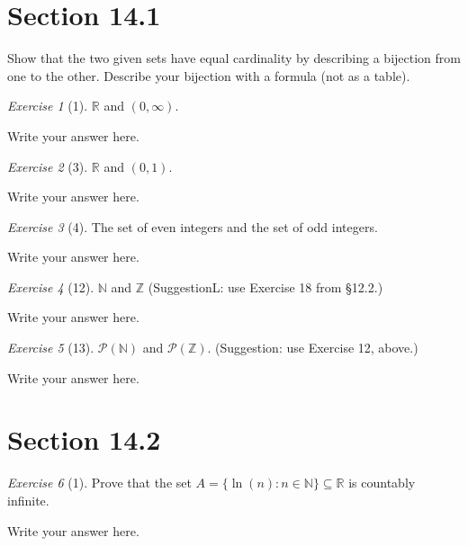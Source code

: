 \documentclass[12pt]{amsart}
\makeatletter
\theoremstyle{remark}
\newtheorem*{exercise}{Exercise}%
\def\RR{\ensuremath{\mathbb R}}
\def\NN{\ensuremath{\mathbb N}}
\def\ZZ{\ensuremath{\mathbb Z}}
\newcommand{\mc}[1]{\ensuremath{\mathcal{#1}}} %
\renewenvironment{proof}[1][\proofname]{\par\doublespacing
  \pushQED{\qed}%
  \normalfont \topsep6\p@\@plus6\p@\relax
  \list{}{%
    \settowidth{\leftmargin}{\itshape\proofname:\hskip\labelsep}%
    \setlength{\labelwidth}{0pt}%
    \setlength{\itemindent}{-\leftmargin}%
  }%
  \item[\hskip\labelsep\itshape#1\@addpunct{:}]\ignorespaces
}{%
  \popQED\endlist\@endpefalse
  \singlespacing
}
\theoremstyle{mycomment}
\makeatother
\begin{document}
\thispagestyle{fancy}

\section*{Section 14.1}
Show that the two given sets have equal cardinality by describing a bijection from one to the other. Describe your bijection with a formula (not as a table).
\begin{exercise}[1] $\RR$ and $(0,\infty)$.
\begin{proof}[Solution]
Write your answer here.
\end{proof}
\end{exercise}

\begin{exercise}[3] $\RR$ and $(0,1)$.
\begin{proof}[Solution]
Write your answer here.
\end{proof}
\end{exercise}

\begin{exercise}[4] The set of even integers and the set of odd integers.
\begin{proof}
Write your answer here.
\end{proof}
\end{exercise}

\begin{exercise}[12] $\NN$ and $\ZZ$ (SuggestionL: use Exercise 18 from \S12.2.)
\begin{proof}[Solution]
Write your answer here.
\end{proof}
\end{exercise}

\begin{exercise}[13] $\mc P(\NN)$ and $\mc P(\ZZ)$. (Suggestion: use Exercise 12, above.)
\begin{proof}
Write your answer here.
\end{proof}
\end{exercise}

\section*{Section 14.2}
\begin{exercise}[1] Prove that the set $A=\{\ln(n):n\in \NN\}\subseteq \RR$ is countably infinite.
\begin{proof}
Write your answer here.
\end{proof}
\end{exercise}
\end{document}
